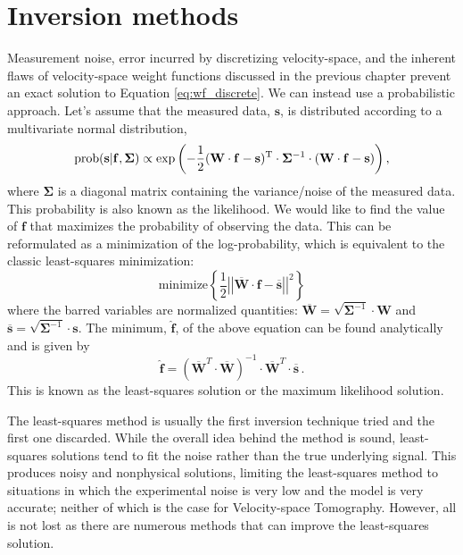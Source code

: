 \section{Inversion methods}\label{sec:methods}
Measurement noise, error incurred by discretizing velocity-space, and the inherent flaws of velocity-space weight functions discussed in the previous chapter prevent an exact solution to Equation \ref{eq:wf_discrete}. We can instead use a probabilistic approach. Let's assume that the measured data, $\mathbf{s}$, is distributed according to a multivariate normal distribution,
\begin{equation}\label{eq:likelihood}
    \rm{prob}(\mathbf{s}|\mathbf{f},\mathbf{\Sigma}) \propto \exp{\left(-\frac{1}{2} (\mathbf{W}\cdot\mathbf{f} - \mathbf{s})^T \cdot \mathbf{\Sigma}^{-1} \cdot (\mathbf{W}\cdot\mathbf{f} - \mathbf{s})\right)}\,,
\end{equation}
where $\mathbf{\Sigma}$ is a diagonal matrix containing the variance/noise of the measured data. This probability is also known as the likelihood. We would like to find the value of $\mathbf{f}$ that maximizes the probability of observing the data. This can be reformulated as a minimization of the log-probability, which is equivalent to the classic least-squares minimization:
\begin{equation}\label{eq:least_squares}
    \mathrm{minimize} \left \lbrace \frac{1}{2}\left|\left| \mathbf{\overline{W}}\cdot\mathbf{f} - \mathbf{\overline{s}}\right|\right|^2 \right \rbrace 
\end{equation}
where the barred variables are normalized quantities: $\mathbf{\overline{W}} = \sqrt{\mathbf{\Sigma}^{-1}}\cdot\mathbf{W}$ and $\mathbf{\overline{s}}=\sqrt{\mathbf{\Sigma}^{-1}}\cdot\mathbf{s}$.
The minimum, $\mathbf{\hat{f}}$, of the above equation can be found analytically and is given by
\begin{equation}\label{eq:least_squares_solution}
    \mathbf{\hat{f}} = \left(\mathbf{\overline{W}}^T\cdot\mathbf{\overline{W}}\right)^{-1}\cdot\mathbf{\overline{W}}^T \cdot \mathbf{\overline{s}}\,.
\end{equation}
This is known as the least-squares solution or the maximum likelihood solution.

The least-squares method is usually the first inversion technique tried and the first one discarded. While the overall idea behind the method is sound, least-squares solutions tend to fit the noise rather than the true underlying signal. This produces noisy and nonphysical solutions, limiting the least-squares method to situations in which the experimental noise is very low and the model is very accurate; neither of which is the case for Velocity-space Tomography.
However, all is not lost as there are numerous methods that can improve the least-squares solution.   

